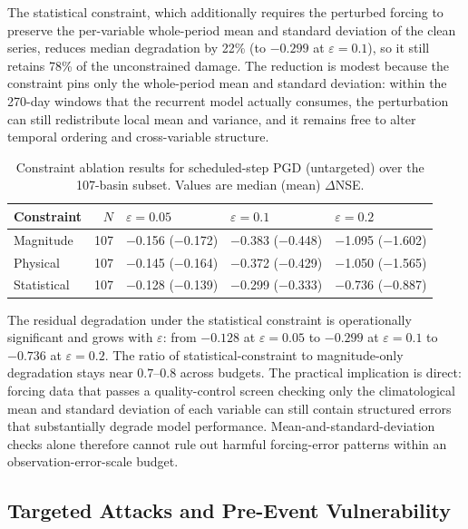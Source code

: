 \documentclass[final]{agujournal2019}
\begin{document}
The statistical constraint, which additionally requires the perturbed forcing to preserve the per-variable whole-period mean and standard deviation of the clean series, reduces median degradation by 22\% (to $-0.299$ at $\varepsilon = 0.1$), so it still retains 78\% of the unconstrained damage. The reduction is modest because the constraint pins only the whole-period mean and standard deviation: within the 270-day windows that the recurrent model actually consumes, the perturbation can still redistribute local mean and variance, and it remains free to alter temporal ordering and cross-variable structure.

\begin{table}[ht]
\caption{Constraint ablation results for scheduled-step PGD (untargeted) over the 107-basin subset. Values are median (mean) $\Delta$NSE.}
\label{tab:constraint}
\centering
\small
\begin{tabular}{lrlll}
\toprule
Constraint & $N$ & $\varepsilon{=}0.05$ & $\varepsilon{=}0.1$ & $\varepsilon{=}0.2$ \\
\midrule
Magnitude & 107 & $-$0.156 ($-$0.172) & $-$0.383 ($-$0.448) & $-$1.095 ($-$1.602) \\
Physical & 107 & $-$0.145 ($-$0.164) & $-$0.372 ($-$0.429) & $-$1.050 ($-$1.565) \\
Statistical & 107 & $-$0.128 ($-$0.139) & $-$0.299 ($-$0.333) & $-$0.736 ($-$0.887) \\
\bottomrule
\end{tabular}
\end{table}

The residual degradation under the statistical constraint is operationally significant and grows with $\varepsilon$: from $-0.128$ at $\varepsilon = 0.05$ to $-0.299$ at $\varepsilon = 0.1$ to $-0.736$ at $\varepsilon = 0.2$. The ratio of statistical-constraint to magnitude-only degradation stays near $0.7$--$0.8$ across budgets. The practical implication is direct: forcing data that passes a quality-control screen checking only the climatological mean and standard deviation of each variable can still contain structured errors that substantially degrade model performance. Mean-and-standard-deviation checks alone therefore cannot rule out harmful forcing-error patterns within an observation-error-scale budget.

\subsection{Targeted Attacks and Pre-Event Vulnerability}
\end{document}
